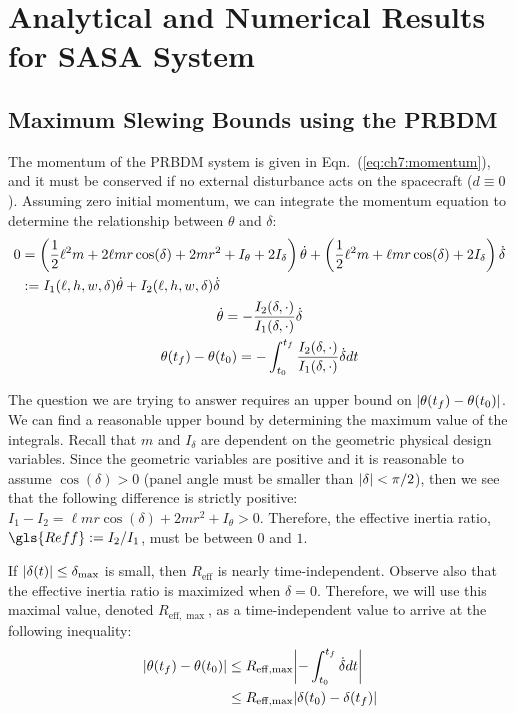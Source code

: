 

\section{Analytical and Numerical Results for SASA System\label{sec:ch7:results}}

\subsection{Maximum Slewing Bounds using the PRBDM \label{sec:ch7:prbdm_bounds}}

The momentum of the PRBDM system is given in Eqn.~(\ref{eq:ch7:momentum}), and it must be conserved if no external disturbance acts on the spacecraft ($d\equiv 0$). Assuming zero initial momentum, we can integrate the momentum equation to determine the relationship
between $\theta$ and $\delta$:
\begin{gather}
\begin{aligned}
0 &= \left( \frac{1}{2} \ell^2 m +  2 \ell m r \cos(\delta) + 2mr^2 + I_\theta + 2I_\delta  \right) \dot{\theta} + \left( \frac{1}{2} \ell^2 m + \ell m r \cos(\delta) + 2I_\delta \right)  \dot{\delta} \\
&:= I_1(\ell,h,w,\delta) \dot{\theta} + I_2(\ell,h,w,\delta) \dot{\delta} 
\end{aligned} \notag \\
\dot{\theta}  = - \frac{I_2(\delta,\cdot)}{I_1(\delta,\cdot)}   \dot{\delta} \notag \\
\theta(t_f) - \theta(t_0)= - \int_{t_0}^{t_f} \frac{I_2(\delta,\cdot)}{I_1(\delta,\cdot)}   \dot{\delta} dt 
\end{gather}

\noindent The question we are trying to answer requires an upper bound on $\lvert\theta(t_f) - \theta(t_0)\rvert$. We can find a reasonable upper bound by determining the maximum value of the integrals. Recall that $m$ and $I_\delta$ are dependent on the geometric physical design variables. Since the geometric variables are positive and it is reasonable to assume $\cos(\delta) > 0$ (panel angle must be smaller than $\lvert\delta\rvert < \pi/2$), then we see that the following difference is strictly positive: $I_1-I_2 = \ell m r \cos\left(\delta\right) + 2 m r^2 + I_{\theta} > 0$. Therefore, the effective inertia ratio, $\gls{Reff} := I_2/I_1$, must be between $0$ and $1$.

If $\lvert\delta(t)\rvert \leq \delta_{\max}$ is small, then $R_{\mathrm{eff}}$ is nearly time-independent. Observe also that the effective inertia ratio is maximized when $\delta = 0$. Therefore, we will use this maximal value, denoted $R_{\mathrm{eff},\max}$, as a time-independent value to arrive at the following inequality:
\begin{align}
\abs{\theta(t_f) - \theta(t_0)} &\leq R_{\mathrm{eff},\max} \abs*{- \int_{t_0}^{t_f} \dot{\delta} dt} \notag \\
&\leq R_{\mathrm{eff},\max} \abs{\delta(t_0) - \delta(t_f)}
\end{align}

